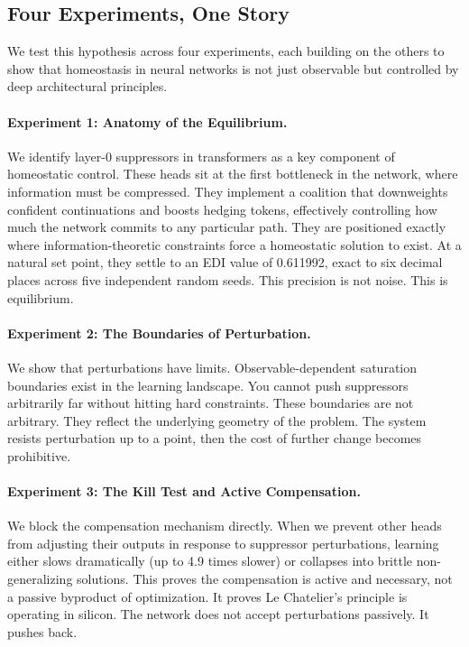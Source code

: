 \subsection{Four Experiments, One Story}

We test this hypothesis across four experiments, each building on the others to show that homeostasis in neural networks is not just observable but controlled by deep architectural principles.

\paragraph{Experiment 1: Anatomy of the Equilibrium.}
We identify layer-0 suppressors in transformers as a key component of homeostatic control. These heads sit at the first bottleneck in the network, where information must be compressed. They implement a coalition that downweights confident continuations and boosts hedging tokens, effectively controlling how much the network commits to any particular path. They are positioned exactly where information-theoretic constraints force a homeostatic solution to exist. At a natural set point, they settle to an EDI value of 0.611992, exact to six decimal places across five independent random seeds. This precision is not noise. This is equilibrium.

\paragraph{Experiment 2: The Boundaries of Perturbation.}
We show that perturbations have limits. Observable-dependent saturation boundaries exist in the learning landscape. You cannot push suppressors arbitrarily far without hitting hard constraints. These boundaries are not arbitrary. They reflect the underlying geometry of the problem. The system resists perturbation up to a point, then the cost of further change becomes prohibitive.

\paragraph{Experiment 3: The Kill Test and Active Compensation.}
We block the compensation mechanism directly. When we prevent other heads from adjusting their outputs in response to suppressor perturbations, learning either slows dramatically (up to 4.9 times slower) or collapses into brittle non-generalizing solutions. This proves the compensation is active and necessary, not a passive byproduct of optimization. It proves Le Chatelier's principle is operating in silicon. The network does not accept perturbations passively. It pushes back.

